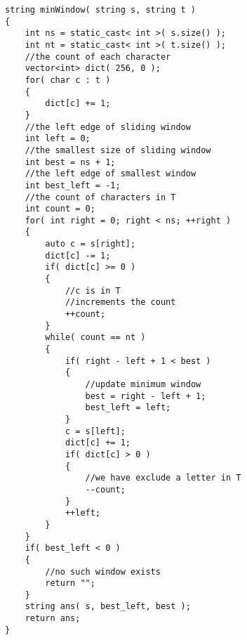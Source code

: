 \setcounter{lstlisting}{0}
\begin{lstlisting}[style=customc, caption={Sliding Window}]
string minWindow( string s, string t )
{
    int ns = static_cast< int >( s.size() );
    int nt = static_cast< int >( t.size() );
    //the count of each character
    vector<int> dict( 256, 0 );
    for( char c : t )
    {
        dict[c] += 1;
    }
    //the left edge of sliding window
    int left = 0;
    //the smallest size of sliding window
    int best = ns + 1;
    //the left edge of smallest window
    int best_left = -1;
    //the count of characters in T
    int count = 0;
    for( int right = 0; right < ns; ++right )
    {
        auto c = s[right];
        dict[c] -= 1;
        if( dict[c] >= 0 )
        {
            //c is in T
            //increments the count
            ++count;
        }
        while( count == nt )
        {
            if( right - left + 1 < best )
            {
                //update minimum window
                best = right - left + 1;
                best_left = left;
            }
            c = s[left];
            dict[c] += 1;
            if( dict[c] > 0 )
            {
                //we have exclude a letter in T
                --count;
            }
            ++left;
        }
    }
    if( best_left < 0 )
    {
        //no such window exists
        return "";
    }
    string ans( s, best_left, best );
    return ans;
}
\end{lstlisting}
